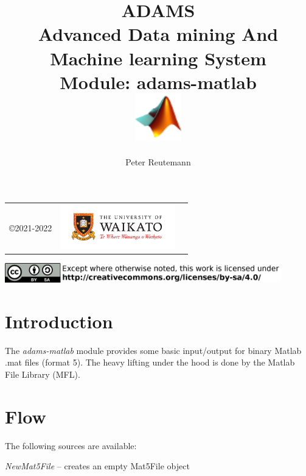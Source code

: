 \documentclass[a4paper]{book}
\title{
  \textbf{ADAMS} \\
  {\Large \textbf{A}dvanced \textbf{D}ata mining \textbf{A}nd \textbf{M}achine
  learning \textbf{S}ystem} \\
  {\Large Module: adams-matlab} \\
  \vspace{1cm}
  \includegraphics[width=2cm]{images/matlab-module.png} \\
}
\author{
  Peter Reutemann
}
\begin{document}
\begin{titlepage}
\maketitle

\thispagestyle{empty}
\center
\begin{table}[b]
	\begin{tabular}{c l l}
		\parbox[c][2cm]{2cm}{\copyright 2021-2022} &
		\parbox[c][2cm]{5cm}{\includegraphics[width=5cm]{images/coat_of_arms.pdf}} \\
	\end{tabular}
	\includegraphics[width=12cm]{images/cc.png} \\
\end{table}

\end{titlepage}

\tableofcontents

\chapter{Introduction}
The \textit{adams-matlab} module provides some basic input/output for binary
Matlab .mat files (format 5). The heavy lifting under the hood is done
by the Matlab File Library (MFL)\cite{mfl}.


\chapter{Flow}
The following sources are available:
\begin{tight_itemize}
  \item \textit{NewMat5File} -- creates an empty Mat5File object
\end{tight_itemize}
\end{document}
